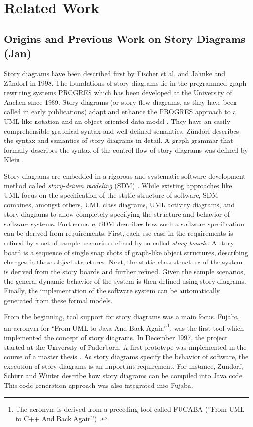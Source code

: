 \chapter{Related Work} \label{sec:RelatedWork}


\section{Origins and Previous Work on Story Diagrams (Jan)}

Story diagrams have been described first by Fischer et al. \cite{FNTZ00} and Jahnke and Z\"{u}ndorf \cite{JZ98} in 1998.
The foundations of story diagrams lie in the programmed graph rewriting systems PROGRES \cite{SWZ95} which has been developed at the University of Aachen since 1989.
Story diagrams (or story flow diagrams, as they have been called in early publications) adapt and enhance the PROGRES approach to a UML-like notation and an object-oriented data model \cite{JZ98}.
They have an easily comprehensible graphical syntax and well-defined semantics.
Z\"{u}ndorf \cite{Zun01} describes the syntax and semantics of story diagrams in detail.
A graph grammar that formally describes the syntax of the control flow of story diagrams was defined by Klein \cite{Kle99}.

Story diagrams are embedded in a rigorous and systematic software development method called \emph{story-driven modeling} (SDM) \cite{Zun01,DGZ04}.
While existing approaches like UML focus on the specification of the static structure of software, SDM combines, amongst others, UML class diagrams, UML activity diagrams, and story diagrams to allow completely specifying the structure and behavior of software systems.
Furthermore, SDM describes how such a software specification can be derived from requirements.
First, each use-case in the requirements is refined by a set of sample scenarios defined by so-called \emph{story boards}.
A story board is a sequence of single snap shots of graph-like object structures, describing changes in these object structures.
Next, the static class structure of the system is derived from the story boards and further refined.
Given the sample scenarios, the general dynamic behavior of the system is then defined using story diagrams.
Finally, the implementation of the software system can be automatically generated from these formal models.

From the beginning, tool support for story diagrams was a main focus.
Fujaba, an acronym for ``From UML to Java And Back Again''\footnote{The acronym is derived from a preceding tool called FUCABA (''From UML to C++ And Back Again'') \cite{JZ97}.}, was the first tool which implemented the concept of story diagrams.
In December 1997, the project started at the University of Paderborn.
A first prototype was implemented in the course of a master thesis \cite{FNT98}.
As story diagrams specify the behavior of software, the execution of story diagrams is an important requirement.
For instance, Z\"{u}ndorf, Sch\"{u}rr and Winter \cite{ZSW99} describe how story diagrams can be compiled into Java code.
This code generation approach was also integrated into Fujaba.

